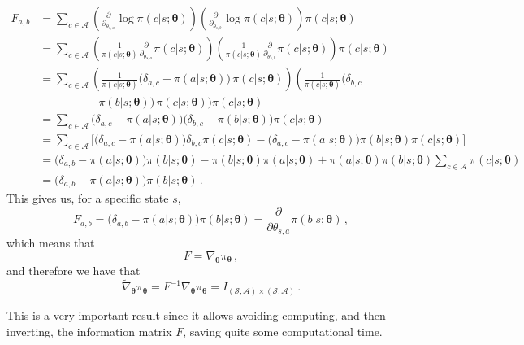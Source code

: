 \begin{align*}
    F_{a,b}
    &= \sum_{c \in \mathcal A} \left( \frac{\partial}{\partial_{\theta_{s,a}}} \log \pi(c|s; \boldsymbol \theta) \right) \left( \frac{\partial}{\partial_{\theta_{s,b}}} \log \pi(c|s; \boldsymbol \theta) \right) \pi(c|s; \boldsymbol \theta) \\
    &= \sum_{c \in \mathcal A} \left( \frac1{\pi(c|s; \boldsymbol \theta)} \frac{\partial}{\partial_{\theta_{s,a}}} \pi(c|s; \boldsymbol \theta) \right) \left( \frac1{\pi(c|s; \boldsymbol \theta)} \frac{\partial}{\partial_{\theta_{s,b}}} \pi(c|s; \boldsymbol \theta) \right) \pi(c|s; \boldsymbol \theta) \\
    &= \sum_{c \in \mathcal A} \left( \frac1{\pi(c|s; \boldsymbol \theta)} \big( \delta_{a,c} - \pi(a|s; \boldsymbol \theta) \big) \, \pi(c|s; \boldsymbol \theta) \right) \left( \frac1{\pi(c|s; \boldsymbol \theta)} \big( \delta_{b,c} \right.\\
    & \qquad\qquad  - \pi(b|s; \boldsymbol \theta) \big) \, \pi(c|s; \boldsymbol \theta) \bigg) \pi(c|s; \boldsymbol \theta) \\
    &= \sum_{c \in \mathcal A} \big( \delta_{a,c} - \pi(a|s; \boldsymbol \theta) \big) \big( \delta_{b,c} - \pi(b|s; \boldsymbol \theta) \big) \pi(c|s; \boldsymbol \theta) \\
    &= \sum_{c \in \mathcal A} \Big[ \big( \delta_{a,c} - \pi(a|s; \boldsymbol \theta) \big) \delta_{b,c} \pi(c|s; \boldsymbol \theta) - \big( \delta_{a,c} - \pi(a|s; \boldsymbol \theta) \big) \pi(b|s; \boldsymbol \theta) \pi(c|s; \boldsymbol \theta) \Big]\\
    &= \big( \delta_{a,b} - \pi(a|s; \boldsymbol \theta) \big) \pi(b|s; \boldsymbol \theta) - \pi(b|s; \boldsymbol \theta) \pi(a|s; \boldsymbol \theta) + \pi(a|s; \boldsymbol \theta) \pi(b|s; \boldsymbol \theta) \sum_{c \in \mathcal A} \pi(c|s; \boldsymbol \theta) \\
    &= \big( \delta_{a,b} - \pi(a|s; \boldsymbol \theta) \big) \pi(b|s; \boldsymbol \theta) \, .
\end{align*}
This gives us, for a specific state $s$,
\begin{equation}
    F_{a,b} = \big( \delta_{a,b} - \pi(a|s; \boldsymbol \theta) \big) \pi(b|s; \boldsymbol \theta) = \frac{\partial}{\partial \theta_{s, a}} \pi(b | s; \boldsymbol \theta) \, ,
\end{equation}
which means that
\begin{equation}
    F = \nabla_{\boldsymbol \theta} \pi_{\boldsymbol \theta} \, ,
\end{equation}
and therefore we have that
\begin{equation}
    \widetilde \nabla_{\boldsymbol \theta} \pi_{\boldsymbol \theta} = F^{-1} \nabla_{\boldsymbol \theta} \pi_{\boldsymbol \theta} =  I_{(\mathcal S, \mathcal A) \times (\mathcal S, \mathcal A)} \, .
    \label{eq:nat-grad-pi}
\end{equation}

This is a very important result since it allows avoiding computing, and then inverting, the information matrix $F$, saving quite some computational time.